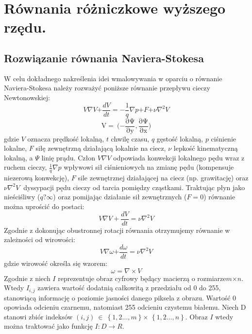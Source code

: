 \documentclass[12pt, twoside, openany]{report}
\theoremstyle{definition}
\begin{document}
\chapter{Równania różniczkowe wyższego rzędu.}
\section{Rozwiązanie równania Naviera-Stokesa }
W celu dokładnego nakreślenia idei wmalowywania w oparciu o równanie Naviera-Stokesa należy rozważyć poniższe równanie przepływu cieczy Newtonowskiej:
\begin{equation}
V\nabla V\mathrm{+}\frac{dV}{dt}\mathrm{=-}\frac{\mathrm{1}}{q}\nabla p\mathrm{+}F\mathrm{+}\nu {\nabla }^{\mathrm{2}}V
\label{NavierStokesEquation}
\end{equation}
\begin{equation}
\mathrm{V=\ (-}\frac{\mathrm{\partial }\mathrm{\Psi }}{\mathrm{\partial }\mathrm{y}},\frac{\mathrm{\partial }\mathrm{\Psi }}{\mathrm{\partial }\mathrm{x}}\mathrm{)}
\label{LiquidVelociy}
\end{equation}
gdzie $V$ oznacza prędkość lokalną, $t$ chwilę czasu, $q$ gęstość lokalną, $p$ ciśnienie lokalne, $F$ siłę zewnętrzną działającą lokalnie na ciecz, $\nu$ lepkość kinematyczną lokalną, a $\mathit{\Psi}$ linię prądu. Człon $V\nabla V$ odpowiada konwekcji lokalnego pędu wraz z ruchem cieczy, $\frac{1}{q}\nabla p$ wpływowi sił ciśnieniowych na zmianę pędu (kompensuje niezerową konwekcję),  $F$ sile zewnętrznej działającej na ciecz (np. grawitację) oraz $\nu {\nabla }^2V\ $ dyssypacji pędu cieczy od tarcia pomiędzy cząstkami. Traktując płyn jako nieściśliwy ($q\textrm{?}\infty $)  oraz pomijając działanie sił zewnętrznych ($F=0$)  równanie można uprościć do postaci:
\begin{equation}
 V\nabla V+\frac{dV}{dt}=\nu {\nabla }^2V
\label{NavierStokesEquationShort}
\end{equation}
Zgodnie z \cite{StreamfuntionVorticityForm} dokonując obustronnej rotacji równania otrzymujemy równanie w zależności od wirowości:
\begin{equation}
V\nabla \omega \mathrm{+}\frac{d\omega }{dt}\mathrm{=}\nu {\nabla }^{\mathrm{2}}V
\label{NavierStokesEquationVorticity}
\end{equation}
gdzie wirowość określa się wzorem:
\begin{equation}
\omega =\nabla \times V
\label{Vorticity}
\end{equation}
Zgodnie z \cite{ebrahimi2012navier} niech $I$ reprezentuje obraz cyfrowy będący macierzą o rozmiarze$m \mathrm{\times} n$. Wtedy $I_{i,j}$ zawiera wartość dodatnią całkowitą z przedziału od 0 do 255, stanowiącą informację o poziomie jasności danego piksela z obrazu. Wartość 0 opowiada odcieniu czarnemu, natomiast 255 odcieniu czystemu białemu. Niech D stanowi zbiór indeksów $(i,j)\ \in \ \left\{1,2\dots ,m\right\} \mathrm{\times}$ $\left\{1,2\dots ,n\right\}$. Obraz $I$ wtedy można traktować jako funkcję $I:D\to R$.
\end{document}
